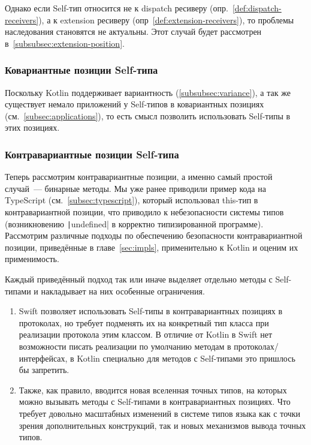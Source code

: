 Однако если Self-тип относится не к dispatch ресиверу (опр.~\ref{def:dispatch-receivers}), а к extension ресиверу (опр~\ref{def:extension-receivers}), то проблемы наследования становятся не актуальны.
Этот случай будет рассмотрен в~\ref{subsubsec:extension-position}.

\subsubsection{Ковариантные позиции Self-типа}

Поскольку Kotlin поддерживает вариантность (\ref{subsubsec:variance}), а так же существует немало приложений у Self-типов в ковариантных позициях (см.~\ref{subsec:applications}), то есть смысл позволить использовать Self-типы в этих позициях.

\subsubsection{Контравариантные позиции Self-типа}

Теперь рассмотрим контравариантные позиции, а именно самый простой случай~--- бинарные методы.
Мы уже ранее приводили пример кода на TypeScript (см.~\ref{subsec:typescript}), который использовал this-тип в контравариантной позиции, что приводило к небезопасности системы типов (возникновению \texttt|undefined| в корректно типизированной программе).
Рассмотрим различные подходы по обеспечению безопасности контравариантной позиции, приведённые в главе~\ref{sec:impls}, применительно к Kotlin и оценим их применимость.

Каждый приведённый подход так или иначе выделяет отдельно методы с Self-типами и накладывает на них особенные ограничения.

\begin{enumerate}
    \item Swift позволяет использовать Self-типы в контравариантных позициях в протоколах, но требует подменять их на конкретный тип класса при реализации протокола этим классом.
    В отличие от Kotlin в Swift нет возможности писать реализации по умолчанию методам в протоколах/интерфейсах, в Kotlin специально для методов с Self-типами это пришлось бы запретить.
    \item Также, как правило, вводится новая вселенная точных типов, на которых можно вызывать методы с Self-типами в контравариантных позициях.
    Что требует довольно масштабных изменений в системе типов языка как с точки зрения дополнительных конструкций, так и новых механизмов вывода точных типов\cite{ryu2016thistype}.
\end{enumerate}

